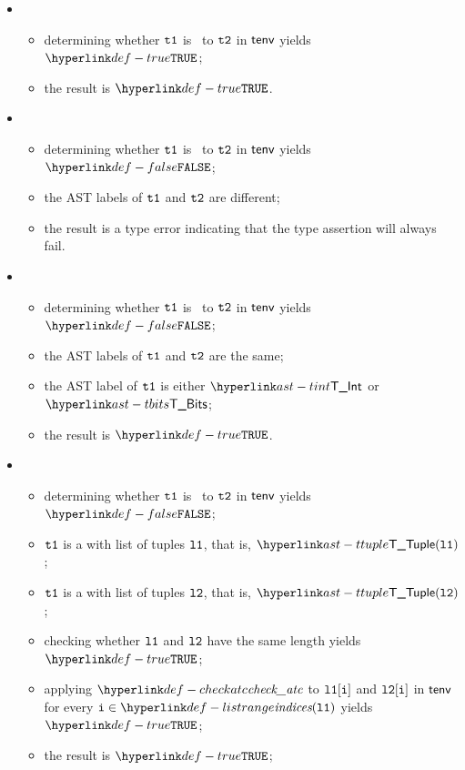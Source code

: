 \ProseParagraph
\OneApplies
\begin{itemize}
  \item {}
  \begin{itemize}
    \item determining whether $\texttt{t1}$ is \typeequivalent\ to $\texttt{t2}$ in $\textsf{tenv}$ yields $\True$\ProseOrTypeError;
    \item the result is $\True$.
  \end{itemize}

  \item {}
  \begin{itemize}
    \item determining whether $\texttt{t1}$ is \typeequivalent\ to $\texttt{t2}$ in $\textsf{tenv}$ yields $\False$;
    \item the AST labels of $\texttt{t1}$ and $\texttt{t2}$ are different;
    \item the result is a type error indicating that the type assertion will always fail.
  \end{itemize}

  \item {}
  \begin{itemize}
    \item determining whether $\texttt{t1}$ is \typeequivalent\ to $\texttt{t2}$ in $\textsf{tenv}$ yields $\False$;
    \item the AST labels of $\texttt{t1}$ and $\texttt{t2}$ are the same;
    \item the AST label of $\texttt{t1}$ is either $\TInt$ or $\TBits$;
    \item the result is $\True$.
  \end{itemize}

  \item {}
  \begin{itemize}
    \item determining whether $\texttt{t1}$ is \typeequivalent\ to $\texttt{t2}$ in $\textsf{tenv}$ yields $\False$;
    \item $\texttt{t1}$ is a \tupletypeterm{} with list of tuples $\texttt{l1}$, that is, $\TTuple(\vlone)$;
    \item $\texttt{t1}$ is a \tupletypeterm{} with list of tuples $\texttt{l2}$, that is, $\TTuple(\vltwo)$;
    \item checking whether $\texttt{l1}$ and $\texttt{l2}$ have the same length yields $\True$\ProseTerminateAs{\TypeAssertionFailure};
    \item applying $\checkatc$ to $\texttt{l1}[\texttt{i}]$ and $\texttt{l2}[\texttt{i}]$ in $\textsf{tenv}$ for every $\vi\in\listrange(\vlone)$ yields $\True$\ProseOrTypeError;
    \item the result is $\True$;
  \end{itemize}


\end{itemize}

